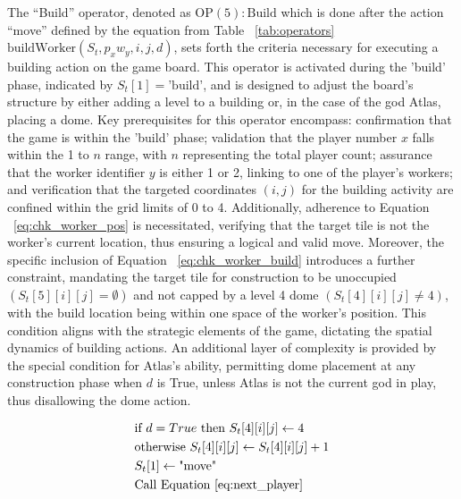 \documentclass{telkomnika}
\begin{document}
The ``Build'' operator, denoted as \( \text{OP}(5):\text{Build} \) which is done after the action ``move'' defined by the equation from Table ~\ref{tab:operators} \( \text{buildWorker}(S_t, p_xw_y, i, j, d) \), sets forth the criteria necessary for executing a building action on the game board. This operator is activated during the 'build' phase, indicated by \( S_t[1] = \text{'build'} \), and is designed to adjust the board's structure by either adding a level to a building or, in the case of the god Atlas, placing a dome. Key prerequisites for this operator encompass: confirmation that the game is within the 'build' phase; validation that the player number \( x \) falls within the 1 to \( n \) range, with \( n \) representing the total player count; assurance that the worker identifier \( y \) is either 1 or 2, linking to one of the player's workers; and verification that the targeted coordinates \( (i, j) \) for the building activity are confined within the grid limits of 0 to 4. Additionally, adherence to Equation ~\ref{eq:chk_worker_pos} is necessitated, verifying that the target tile is not the worker's current location, thus ensuring a logical and valid move. Moreover, the specific inclusion of Equation ~\ref{eq:chk_worker_build} introduces a further constraint, mandating the target tile for construction to be unoccupied \( (S_t[5][i][j] = \emptyset) \) and not capped by a level 4 dome \( (S_t[4][i][j] \neq 4) \), with the build location being within one space of the worker's position. This condition aligns with the strategic elements of the game, dictating the spatial dynamics of building actions. An additional layer of complexity is provided by the special condition for Atlas's ability, permitting dome placement at any construction phase when \( d \) is True, unless Atlas is not the current god in play, thus disallowing the dome action.

\begin{equation}
 \begin{aligned}
    &\text{if } d = True \text{ then }S_t[4][i][j]\leftarrow 4\\
    &\text{otherwise } S_t[4][i][j] \leftarrow S_t[4][i][j]+1\\
    &S_t[1]\leftarrow \text{"move"}\\
    &\text{Call Equation~\ref{eq:next_player}}
 \end{aligned}
\label{eq:worker_build}
\end{equation}
\end{document}
